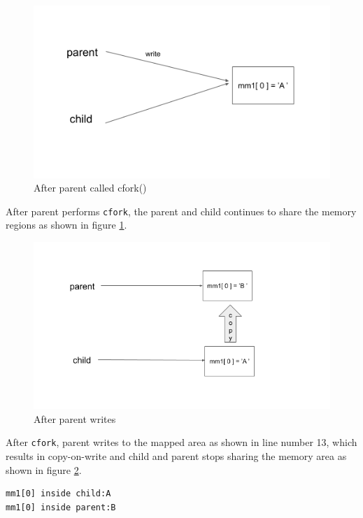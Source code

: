 \documentclass[12pt]{article}
\begin{document}
\begin{figure}[H]
    \centering
    \includegraphics[scale=.5]{cfork.png}
    \caption{After parent called cfork()}
    \label{fig:cfork}
\end{figure}

After parent performs {\tt cfork}, the parent and child continues to share the memory regions as shown in figure \ref{fig:cfork}.

\begin{figure}[H]
    \centering
    \includegraphics[scale=.5]{after_cfork.png}
    \caption{After parent writes}
    \label{fig:after_write}
\end{figure}

After {\tt cfork}, parent writes to the mapped area as shown in line number 13, which results in copy-on-write and child and parent stops sharing the memory area as shown in figure \ref{fig:after_write}. 

\begin{verbatim}
mm1[0] inside child:A
mm1[0] inside parent:B
\end{verbatim}
\end{document}
